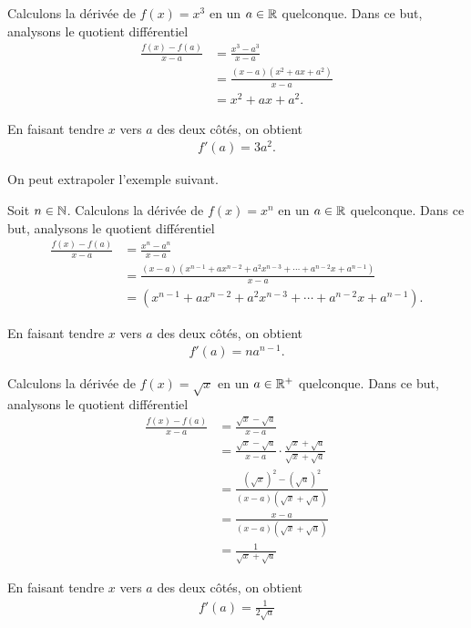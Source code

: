 \documentclass[main.tex]{subfiles}
\begin{document}
\begin{example}
    [Dérivée de $x^3$]

    Calculons la dérivée de $f(x) = x^3$ en un $a \in \mathbb{R}$ quelconque.
    Dans ce but,
    analysons le quotient différentiel
    \begin{align}
        \frac {f(x) - f(a)}{x - a}
        &= \frac {x^3 - a^3}{x - a}\\
        &= \frac {(x-a)(x^2 + ax + a^2)}{x - a}\\
        &= x^2 + ax + a^2.
    \end{align}

    En faisant tendre $x$ vers $a$ des deux côtés,
    on obtient
    \begin{align}
        f'(a) = 3a^2.
    \end{align}
\end{example}

On peut extrapoler l'exemple suivant.

\begin{example}
    [Dérivée de $x^n$]

    Soit $n \in \mathbb{N}$.
    Calculons la dérivée de $f(x) = x^n$ en un $a \in \mathbb{R}$ quelconque.
    Dans ce but,
    analysons le quotient différentiel
    \begin{align}
        \frac {f(x) - f(a)}{x - a}
        &= \frac {x^n - a^n}{x - a}\\
        &= \frac {(x-a)(x^{n-1} + ax^{n-2} + a^2x^{n-3} + \cdots + a^{n-2}x + a^{n-1})}{x - a}\\
        &= (x^{n-1} + ax^{n-2} + a^2x^{n-3} + \cdots + a^{n-2}x + a^{n-1}).
    \end{align}

    En faisant tendre $x$ vers $a$ des deux côtés,
    on obtient
    \begin{align}
        f'(a) = na^{n-1}.
    \end{align}
\end{example}

\begin{example}

    Calculons la dérivée de $f(x) = \sqrt x$ en un $a \in \mathbb{R}^+$ quelconque.
    Dans ce but,
    analysons le quotient différentiel
    \begin{align}
        \frac {f(x) - f(a)}{x - a}
        &= \frac {\sqrt x - \sqrt a}{x - a}\\
        &= \frac {\sqrt x - \sqrt a}{x - a} \cdot \frac{\sqrt x + \sqrt a}{\sqrt x + \sqrt a}\\
        &= \frac {{(\sqrt x)}^2 - {(\sqrt a)}^2}{(x - a) (\sqrt x + \sqrt a)}\\
        &= \frac {x - a} {(x - a) (\sqrt x + \sqrt a)}\\
        &= \frac 1 {\sqrt x + \sqrt a}
    \end{align}

    En faisant tendre $x$ vers $a$ des deux côtés,
    on obtient
    \begin{align}
        f'(a) = \frac 1 {2 \sqrt a}
    \end{align}
\end{example}
\end{document}
